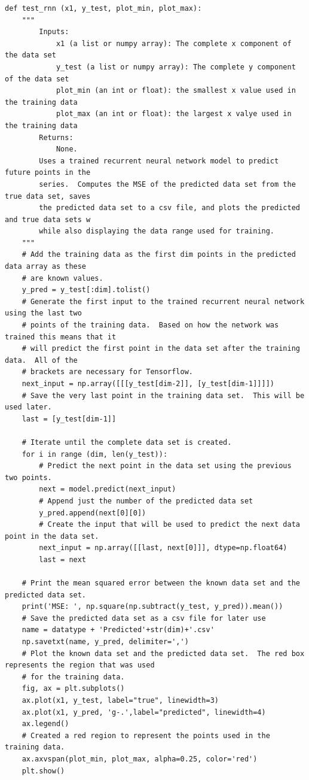 \documentclass[%
oneside,                 %
final,                   %
10pt]{article}
\begin{document}
\begin{verbatim}
def test_rnn (x1, y_test, plot_min, plot_max):
    """
        Inputs:
            x1 (a list or numpy array): The complete x component of the data set
            y_test (a list or numpy array): The complete y component of the data set
            plot_min (an int or float): the smallest x value used in the training data
            plot_max (an int or float): the largest x valye used in the training data
        Returns:
            None.
        Uses a trained recurrent neural network model to predict future points in the 
        series.  Computes the MSE of the predicted data set from the true data set, saves
        the predicted data set to a csv file, and plots the predicted and true data sets w
        while also displaying the data range used for training.
    """
    # Add the training data as the first dim points in the predicted data array as these
    # are known values.
    y_pred = y_test[:dim].tolist()
    # Generate the first input to the trained recurrent neural network using the last two 
    # points of the training data.  Based on how the network was trained this means that it
    # will predict the first point in the data set after the training data.  All of the 
    # brackets are necessary for Tensorflow.
    next_input = np.array([[[y_test[dim-2]], [y_test[dim-1]]]])
    # Save the very last point in the training data set.  This will be used later.
    last = [y_test[dim-1]]

    # Iterate until the complete data set is created.
    for i in range (dim, len(y_test)):
        # Predict the next point in the data set using the previous two points.
        next = model.predict(next_input)
        # Append just the number of the predicted data set
        y_pred.append(next[0][0])
        # Create the input that will be used to predict the next data point in the data set.
        next_input = np.array([[last, next[0]]], dtype=np.float64)
        last = next

    # Print the mean squared error between the known data set and the predicted data set.
    print('MSE: ', np.square(np.subtract(y_test, y_pred)).mean())
    # Save the predicted data set as a csv file for later use
    name = datatype + 'Predicted'+str(dim)+'.csv'
    np.savetxt(name, y_pred, delimiter=',')
    # Plot the known data set and the predicted data set.  The red box represents the region that was used
    # for the training data.
    fig, ax = plt.subplots()
    ax.plot(x1, y_test, label="true", linewidth=3)
    ax.plot(x1, y_pred, 'g-.',label="predicted", linewidth=4)
    ax.legend()
    # Created a red region to represent the points used in the training data.
    ax.axvspan(plot_min, plot_max, alpha=0.25, color='red')
    plt.show()


\end{verbatim}
\end{document}
